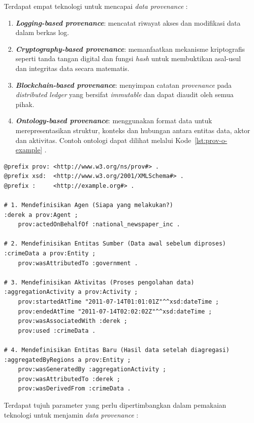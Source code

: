 Terdapat empat teknologi untuk mencapai \textit{data provenance} \parencite{Ahmed_2023_Data_Provenance}:
\begin{enumerate}
    \item \textbf{\textit{Logging-based provenance}}: mencatat riwayat akses dan modifikasi data dalam berkas log. 
    \item \textbf{\textit{Cryptography-based provenance}}: memanfaatkan mekanisme kriptografis seperti tanda tangan digital dan fungsi \textit{hash} untuk membuktikan asal-usul dan integritas data secara matematis. 
    \item \textbf{\textit{Blockchain-based provenance}}: menyimpan catatan \textit{provenance} pada \textit{distributed ledger} yang bersifat \textit{immutable} dan dapat diaudit oleh semua pihak.
    \item \textbf{\textit{Ontology-based provenance}}: menggunakan format data untuk merepresentasikan struktur, konteks dan hubungan antara entitas data, aktor dan aktivitas. 
    Contoh ontologi dapat dilihat melalui Kode~\ref{lst:prov-o-example} \parencite{w3PROVOPROV}.
\end{enumerate}

\begin{lstlisting}[caption={Contoh Implementasi Data Provenance Berdasarkan W3C PROV-O}, label={lst:prov-o-example}, float=htb]
@prefix prov: <http://www.w3.org/ns/prov#> .
@prefix xsd:  <http://www.w3.org/2001/XMLSchema#> .
@prefix :     <http://example.org#> .

# 1. Mendefinisikan Agen (Siapa yang melakukan?)
:derek a prov:Agent ;
    prov:actedOnBehalfOf :national_newspaper_inc .

# 2. Mendefinisikan Entitas Sumber (Data awal sebelum diproses)
:crimeData a prov:Entity ;
    prov:wasAttributedTo :government .

# 3. Mendefinisikan Aktivitas (Proses pengolahan data)
:aggregationActivity a prov:Activity ;
    prov:startedAtTime "2011-07-14T01:01:01Z"^^xsd:dateTime ;
    prov:endedAtTime "2011-07-14T02:02:02Z"^^xsd:dateTime ;
    prov:wasAssociatedWith :derek ;
    prov:used :crimeData .

# 4. Mendefinisikan Entitas Baru (Hasil data setelah diagregasi)
:aggregatedByRegions a prov:Entity ;
    prov:wasGeneratedBy :aggregationActivity ;
    prov:wasAttributedTo :derek ;
    prov:wasDerivedFrom :crimeData .
\end{lstlisting}

Terdapat tujuh parameter yang perlu dipertimbangkan dalam pemakaian teknologi untuk menjamin \textit{data provenance} \parencite{Ahmed_2023_Data_Provenance}:

